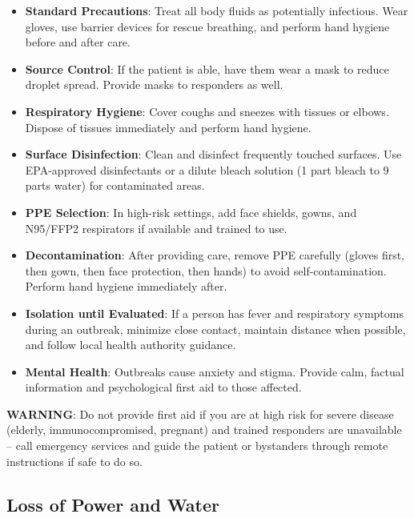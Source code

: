 \begin{itemize}
  \item \textbf{Standard Precautions}: Treat all body fluids as potentially infectious. Wear gloves, use barrier devices for rescue breathing, and perform hand hygiene before and after care.
  \item \textbf{Source Control}: If the patient is able, have them wear a mask to reduce droplet spread. Provide masks to responders as well.
  \item \textbf{Respiratory Hygiene}: Cover coughs and sneezes with tissues or elbows. Dispose of tissues immediately and perform hand hygiene.
  \item \textbf{Surface Disinfection}: Clean and disinfect frequently touched surfaces. Use EPA-approved disinfectants or a dilute bleach solution (1 part bleach to 9 parts water) for contaminated areas.
  \item \textbf{PPE Selection}: In high-risk settings, add face shields, gowns, and N95/FFP2 respirators if available and trained to use.
  \item \textbf{Decontamination}: After providing care, remove PPE carefully (gloves first, then gown, then face protection, then hands) to avoid self-contamination. Perform hand hygiene immediately after.
  \item \textbf{Isolation until Evaluated}: If a person has fever and respiratory symptoms during an outbreak, minimize close contact, maintain distance when possible, and follow local health authority guidance.
  \item \textbf{Mental Health}: Outbreaks cause anxiety and stigma. Provide calm, factual information and psychological first aid to those affected.
\end{itemize}

\textbf{WARNING}: Do not provide first aid if you are at high risk for severe disease (elderly, immunocompromised, pregnant) and trained responders are unavailable -- call emergency services and guide the patient or bystanders through remote instructions if safe to do so.

\subsection{Loss of Power and Water}

